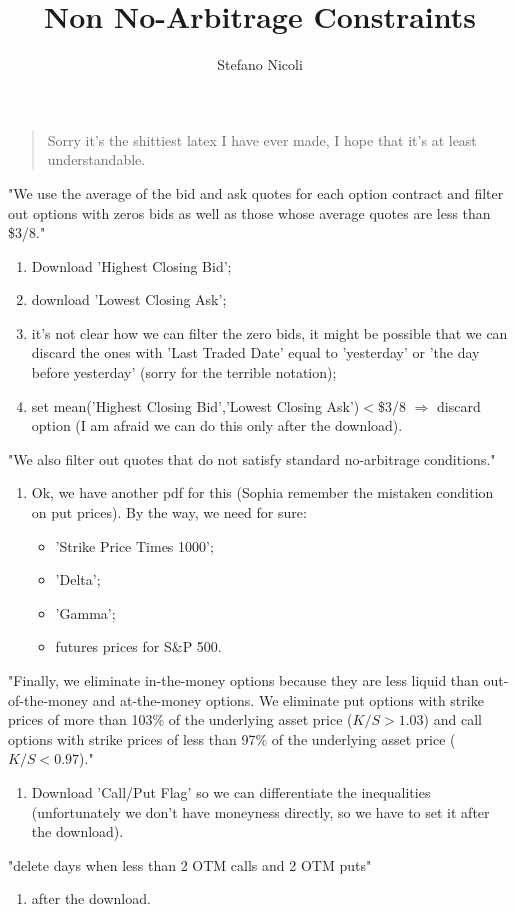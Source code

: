 \documentclass{article}
\title{Non No-Arbitrage Constraints}
\author{Stefano Nicoli}
\begin{document}
\maketitle
\begin{quote}
    

Sorry it's the shittiest latex I have ever made, I hope that it's at least understandable.

\end{quote}
"We use the average of the bid and ask quotes for each option contract and filter out options with zeros bids as well as those whose average quotes are less than \$3/8."
\begin{enumerate}
    \item Download 'Highest Closing Bid';
    \item download 'Lowest Closing Ask';
    \item it's not clear how we can filter the zero bids, it might be possible that we can discard the ones with 'Last Traded Date' equal to 'yesterday' or 'the day before yesterday' (sorry for the terrible notation);
    \item set mean('Highest Closing Bid','Lowest Closing Ask')$<$\$3/8 $\Rightarrow$ discard option (I am afraid we can do this only after the download).
\end{enumerate}
"We also filter out quotes that do not satisfy standard no-arbitrage conditions."
\begin{enumerate}
\item Ok, we have another pdf for this (Sophia remember the mistaken condition on put prices). By the way, we need for sure:
    \begin{itemize}
        \item 'Strike Price Times 1000';
        \item 'Delta';
        \item 'Gamma';
        \item futures prices for S\&P 500.
    \end{itemize}
\end{enumerate}
"Finally, we eliminate in-the-money options because they are less liquid than out-of-the-money and at-the-money options. We eliminate put options with strike prices of more than 103\% of the underlying asset price ($K/S>1.03$) and call options with strike prices of less than 97\% of the underlying asset price ($K/S<0.97$)."
\begin{enumerate}
    \item Download 'Call/Put Flag' so we can differentiate the inequalities (unfortunately we don't have moneyness directly, so we have to set it after the download).
\end{enumerate}
"delete days when less than 2 OTM calls and 2 OTM puts"
\begin{enumerate}
    \item after the download.
\end{enumerate}
\end{document}
